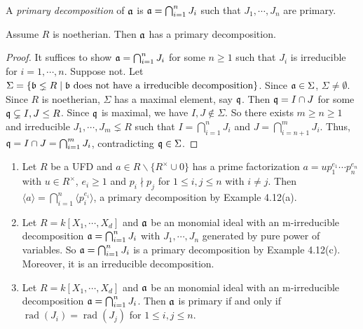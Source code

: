 \begin{definition}
    A \emph{primary decomposition} of $\mathfrak{a}$ is $\mathfrak{a} = \bigcap_{i=1}^{n} J_i$ such that $J_1,\cdots,J_n$ are primary. 
\end{definition}

\begin{theorem}[Noether] 
    Assume $R$ is noetherian. Then $\mathfrak{a}$ has a primary decomposition.
\end{theorem}

\begin{proof}
    It suffices to show $\mathfrak{a} = \bigcap_{i=1}^{n} J_i$ for some $n \geq 1$ such that $J_i$ is irreducible for $i = 1,\cdots,n$. Suppose not. Let $\Sigma = \{\mathfrak{b} \lneq R \mid \mathfrak{b} \text{ does not have a irreducible decomposition}\}$. Since $\mathfrak{a} \in \Sigma$, $\Sigma \neq \emptyset$. Since $R$ is noetherian, $\Sigma$ has a maximal element, say $\mathfrak{q}$. Then $\mathfrak{q} = I \cap J$ for some $\mathfrak{q} \subsetneq I,J \leq R$. Since $\mathfrak{q}$ is maximal, we have $I,J \not \in \Sigma$. So there exists $m \geq n \geq 1$ and irreducible $J_1,\cdots,J_m \lneq R$ such that $I = \bigcap_{i=1}^{n}J_i$ and $J = \bigcap_{i=n+1}^{m} J_i$. Thus, $\mathfrak{q} = I \cap J = \bigcap_{i=1}^{m} J_i$, contradicting $\mathfrak{q} \in \Sigma$.
\end{proof}

\begin{example}
    \begin{enumerate}
        \item Let $R$ be a UFD and $a \in R \smallsetminus \{R^{\times} \cup 0\}$ has a prime factorization $a = up_1^{e_1} \cdots p_n^{e_n}$ with $u \in R^{\times}$, $e_i \geq 1$ and $p_i \nmid p_j$ for $1 \leq i,j \leq n$ with $i \neq j$. Then $\langle a \rangle = \bigcap_{i=1}^{n} \langle p_i^{e_i} \rangle$, a primary decomposition by Example 4.12(a). 
        \item Let $R = k[X_1,\cdots,X_d]$ and $\mathfrak{a}$ be an monomial ideal with an m-irreducible decomposition $\mathfrak{a} = \bigcap_{i=1}^{n}J_i$ with $J_1,\cdots,J_n$ generated by pure power of variables. So $\mathfrak{a} = \bigcap_{i=1}^{n} J_i$ is a primary decomposition by Example 4.12(c). Moreover, it is an irreducible decomposition.
        \item Let $R = k[X_1,\cdots,X_d]$ and $\mathfrak{a}$ be an monomial ideal with an m-irreducible decomposition $\mathfrak{a} = \bigcap_{i=1}^{n}J_i$. Then $\mathfrak{a}$ is primary if and only if $\operatorname{rad}(J_i) = \operatorname{rad}(J_j)$ for $1 \leq i,j \leq n$.
    \end{enumerate}
\end{example}

